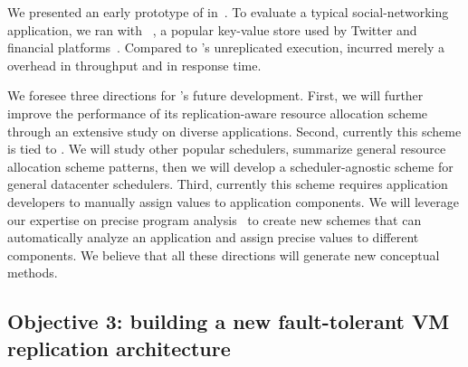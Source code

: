  We presented an early prototype of \tripod
in~\cite{tripod:apsys16}. To evaluate a typical social-networking application, 
we ran \tripod with \memcached~\cite{memcached}, a popular key-value store used 
by Twitter and financial platforms~\cite{nosql:finance}. Compared to 
\memcached's unreplicated execution, \tripod incurred merely a \tputoverhead 
overhead in throughput and \latencyoverhead in response time.


 We foresee three directions for \tripod's future 
development. First, we will further improve the performance of its 
replication-aware resource allocation scheme through an extensive study on 
diverse applications. Second, currently this scheme is tied to \mesos. We will 
study other popular schedulers, summarize general resource allocation scheme 
patterns, then we will develop a scheduler-agnostic scheme for general 
datacenter schedulers. Third, currently this scheme requires application 
developers to manually assign  values to application components. We will 
leverage our expertise on precise 
program analysis~\cite{peregrine:sosp11,woodpecker:asplos13} to create new 
schemes that can automatically analyze an application and assign precise  
values to different components. We believe that all these directions will 
generate new conceptual methods.

\vspace{-.15in}\subsection{Objective 3: building a new fault-tolerant VM 
replication architecture}\label{sec:vm}\vspace{-.075in}


